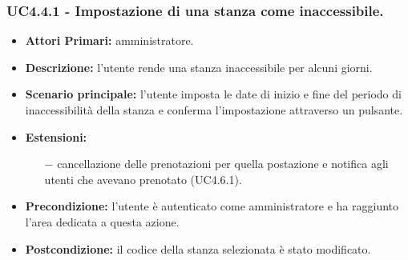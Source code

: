\subsubsection{UC4.4.1 - Impostazione di una stanza come inaccessibile.}
\begin{itemize}
	\item\textbf{Attori Primari:}
	amministratore.
	\item\textbf{Descrizione:}
	l'utente rende una stanza inaccessibile per alcuni giorni.
	\item\textbf{Scenario principale:} 
	l'utente imposta le date di inizio e fine del periodo di inaccessibilità della stanza e conferma l'impostazione attraverso un pulsante.
	\item\textbf{Estensioni:}
	\begin{itemize}
		\item[$-$] cancellazione delle prenotazioni per quella postazione e notifica agli utenti che avevano prenotato (UC4.6.1).
	\end{itemize}
	\item\textbf{Precondizione:} 
	l'utente è autenticato come amministratore e ha raggiunto l'area dedicata a questa azione.
	\item\textbf{Postcondizione:}
	il codice della stanza selezionata è stato modificato.
\end{itemize}

